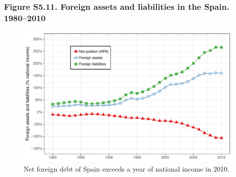 \documentclass[t]{beamer}\usepackage[]{graphicx}\usepackage[]{color}
\makeatletter
\def\maxwidth{ %
  \ifdim\Gin@nat@width>\linewidth
    \linewidth
  \else
    \Gin@nat@width
  \fi
}
\newenvironment{knitrout}{}{} %
\makeatother
\begin{document}
\begin{frame}[label=Figure_S5_11]
\frametitle{Figure S5.11. Foreign assets and liabilities in the Spain. 1980--2010}
\begin{figure}[t]
\begin{minipage}[b]{\textwidth}
\centering
\begin{knitrout}\footnotesize
{}\color{fgcolor}

{\centering \includegraphics[width=\maxwidth]{figures/color/Figure_S5_11} 

}



\end{knitrout}
\caption{Net foreign debt of Spain exceeds a year of national income in 2010.}
\end{minipage}
\end{figure}
\end{frame}
\end{document}
